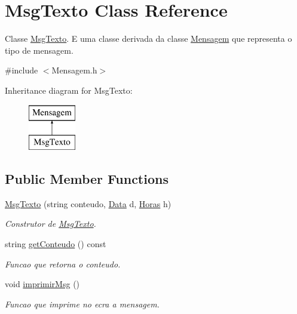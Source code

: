 \hypertarget{class_msg_texto}{}\section{Msg\+Texto Class Reference}
\label{class_msg_texto}


Classe \hyperlink{class_msg_texto}{Msg\+Texto}. E uma classe derivada da classe \hyperlink{class_mensagem}{Mensagem} que representa o tipo de mensagem.  




{\ttfamily \#include $<$Mensagem.\+h$>$}

Inheritance diagram for Msg\+Texto\+:\begin{figure}[H]
\begin{center}
\leavevmode
\includegraphics[height=2.000000cm]{class_msg_texto}
\end{center}
\end{figure}
\subsection*{Public Member Functions}
\begin{DoxyCompactItemize}
\item 
\hyperlink{class_msg_texto_a8ad133274a0f20954695cd2b2c619595}{Msg\+Texto} (string conteudo, \hyperlink{class_data}{Data} d, \hyperlink{class_horas}{Horas} h)
\begin{DoxyCompactList}\small\item\em Construtor de \hyperlink{class_msg_texto}{Msg\+Texto}. \end{DoxyCompactList}\item 
string \hyperlink{class_msg_texto_a9743e624bf980d9b4ed0db65a947f203}{get\+Conteudo} () const 
\begin{DoxyCompactList}\small\item\em Funcao que retorna o conteudo. \end{DoxyCompactList}\item 
\hypertarget{class_msg_texto_ac621ebd05f2c55fcfe9746ff402ab26b}{}void \hyperlink{class_msg_texto_ac621ebd05f2c55fcfe9746ff402ab26b}{imprimir\+Msg} ()\label{class_msg_texto_ac621ebd05f2c55fcfe9746ff402ab26b}

\begin{DoxyCompactList}\small\item\em Funcao que imprime no ecra a mensagem. \end{DoxyCompactList}\end{DoxyCompactItemize}

